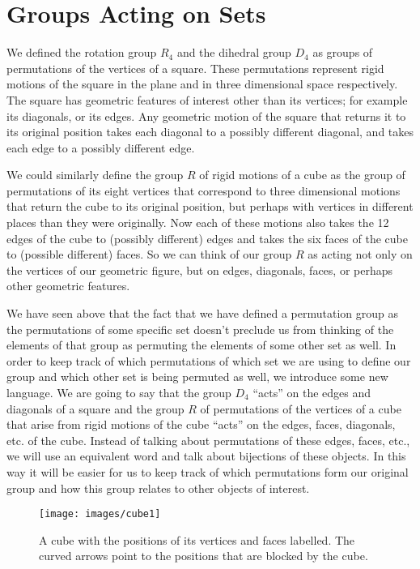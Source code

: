 \documentclass[10pt,]{book}
\theoremstyle{plain}
\theoremstyle{definition}
\numberwithin{equation}{chapter}
\begin{document}
\section[{Groups Acting on Sets}]{Groups Acting on Sets}\label{sec_groups-groupsact}
We defined the rotation group \(R_4\) and the dihedral group \(D_4\) as groups of permutations of the vertices of a square. These permutations represent rigid motions of the square in the plane and in three dimensional space respectively. The square has geometric features of interest other than its vertices; for example its diagonals, or its edges. Any geometric motion of the square that returns it to its original position takes each diagonal to a possibly different diagonal, and takes each edge to a possibly different edge.%
\par
We could similarly define the group \(R\) of rigid motions of a cube as the group of permutations of its eight vertices that correspond to three dimensional motions that return the cube to its original position, but perhaps with vertices in different places than they were originally. Now each of these motions also takes the 12 edges of the cube to (possibly different) edges and takes the six faces of the cube to (possible different) faces. So we can think of our group \(R\) as acting not only on the vertices of our geometric figure, but on edges, diagonals, faces, or perhaps other geometric features.%
\par
We have seen above that the fact that we have defined a permutation group as the permutations of some specific set doesn't preclude us from thinking of the elements of that group as permuting the elements of some other set as well. In order to keep track of which permutations of which set we are using to define our group and which other set is being permuted as well, we introduce some new language. We are going to say that the group \(D_4\) ``acts'' on the edges and diagonals of a square and the group \(R\) of permutations of the vertices of a cube that arise from rigid motions of the cube ``acts'' on the edges, faces, diagonals, etc. of the cube. Instead of talking about permutations of these edges, faces, etc., we will use an equivalent word and talk about bijections of these objects. In this way it will be easier for us to keep track of which permutations form our original group and how this group relates to other objects of interest.%
\begin{figure}
\centering
\texttt{[image: images/cube1]}
\caption{A cube with the positions of its vertices and faces labelled.  The curved arrows point to the positions that are blocked by the cube.\label{cube1}}
\end{figure}
\end{document}
